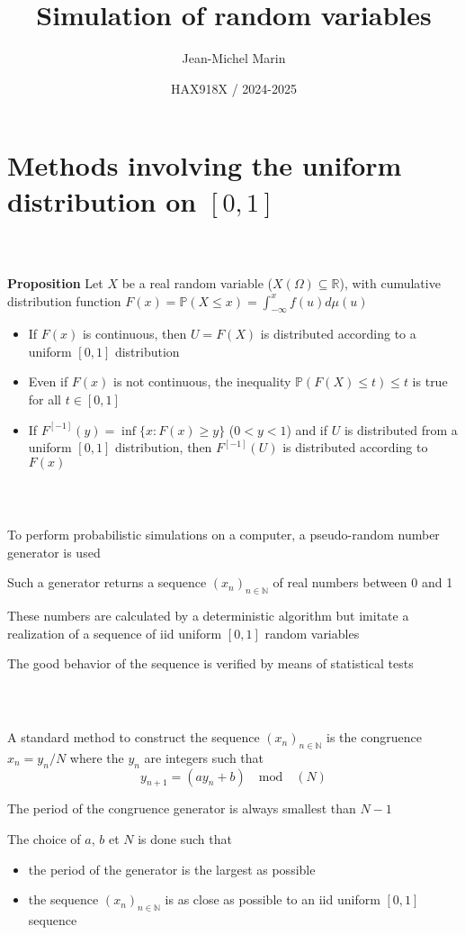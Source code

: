 \documentclass[notes,professionalfont,11pt,usenames,dvipsnames]{beamer}
\title[Simulation]{Simulation of random variables}
\author[Jean-Michel Marin]{Jean-Michel Marin}
\institute[IMAG]{University of Montpellier \\
Faculty of Sciences}
\date[HAX918X]{HAX918X / 2024-2025}
\renewcommand{\P}{\mathbb{P}}
\newcommand\justify{\rightskip0pt \leftskip0pt}
\newenvironment{slide}
{\begin{frame}[environment=slide]
\frametitle{\insertsection \\ \insertsubsection}\justify\setlength{\parskip}{0.5cm}\vspace{-0.5cm}}
{\end{frame}}
\begin{document}
\frame{\titlepage}

\frame{\tableofcontents} 

\section{Methods involving the uniform distribution on $[0,1]$}

\begin{slide}

{\bf Proposition} Let $X$ be a real random variable ($X(\Omega)\subseteq \mathbb{R}$), 
with cumulative distribution function 
$F(x)=\P(X\leq x)=\int_{-\infty}^x f(u)d\mu(u)$
\begin{itemize}
\item If $F(x)$ is continuous, then $U=F(X)$ is distributed according to a uniform $[0,1]$ distribution 
\item Even if $F(x)$ is not continuous, the inequality $\P(F(X)\leq t)\leq t$ is true for all $t\in [0,1]$
\item If $F^{[-1]}(y)=\inf\{x:F(x)\geq y\}$ ($0<y<1$) and if $U$ is distributed from a uniform $[0,1]$ distribution, 
then $F^{[-1]}(U)$ is distributed according to $F(x)$ 
\end{itemize}

\end{slide}

\begin{slide}

To perform probabilistic simulations on a computer, 
a pseudo-random number generator is used

Such a generator returns a sequence $(x_n)_{n\in\mathbb{N}}$ of real numbers between 0 and 1
 
These numbers are calculated by a deterministic algorithm but imitate a realization of a 
sequence of iid uniform $[0,1]$ random variables

The good behavior of the sequence is verified by means of statistical tests

\end{slide}

\begin{slide}

A standard method to construct the sequence $(x_n)_{n\in\mathbb{N}}$
is the congruence $x_n=y_n/N$
where the $y_n$ are integers such that
$$
y_{n+1}=(ay_n+b)\quad\mbox{mod}\quad (N)
$$

The period of the congruence generator is always smallest 
than $N-1$

The choice of  $a$, $b$ et $N$ is done such that 
\begin{itemize}
\item the period of the generator is the largest as possible 
\item the sequence $(x_n)_{n\in\mathbb{N}}$ is as close as possible to an iid uniform 
$[0,1]$ sequence
\end{itemize}

\end{slide}
\end{document}
